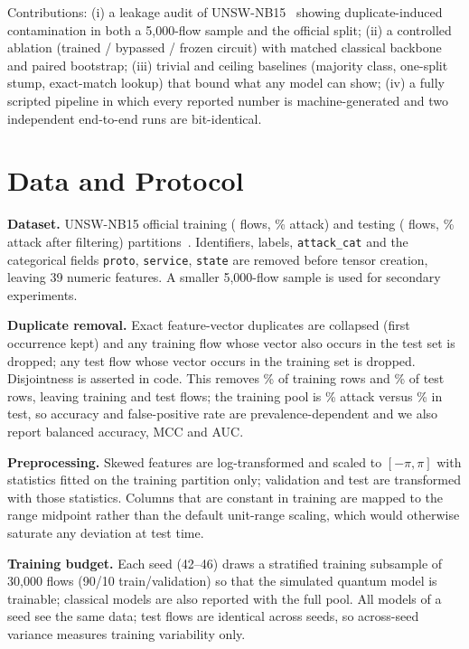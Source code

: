 \IfFileExists{IEEEtran.cls}{\documentclass[conference]{IEEEtran}}{\documentclass[10pt,twocolumn]{article}\usepackage[margin=0.8in]{geometry}}
\begin{document}
Contributions: (i) a leakage audit of UNSW-NB15~\cite{moustafa2015unsw} showing duplicate-induced contamination in both a 5{,}000-flow sample and the official split; (ii) a controlled ablation (trained / bypassed / frozen circuit) with matched classical backbone and paired bootstrap; (iii) trivial and ceiling baselines (majority class, one-split stump, exact-match lookup) that bound what any model can show; (iv) a fully scripted pipeline in which every reported number is machine-generated and two independent end-to-end runs are bit-identical.

\section{Data and Protocol}
\textbf{Dataset.} UNSW-NB15 official training (\offTrainRows{} flows, \offTrainAttackPct\% attack) and testing (\offTestRows{} flows, \offTestAttackPct\% attack after filtering) partitions~\cite{moustafa2015unsw}. Identifiers, labels, \texttt{attack\_cat} and the categorical fields \texttt{proto}, \texttt{service}, \texttt{state} are removed before tensor creation, leaving 39 numeric features. A smaller 5{,}000-flow sample is used for secondary experiments.

\textbf{Duplicate removal.} Exact feature-vector duplicates are collapsed (first occurrence kept) and any training flow whose vector also occurs in the test set is dropped; any test flow whose vector occurs in the training set is dropped. Disjointness is asserted in code. This removes \offTrainDupPct\% of training rows and \offTestTwinPct\% of test rows, leaving \offTrainPool{} training and \offTestFinal{} test flows; the training pool is \offPoolAttackPct\% attack versus \offTestAttackPct\% in test, so accuracy and false-positive rate are prevalence-dependent and we also report balanced accuracy, MCC and AUC.

\textbf{Preprocessing.} Skewed features are log-transformed and scaled to $[-\pi,\pi]$ with statistics fitted on the training partition only; validation and test are transformed with those statistics. Columns that are constant in training are mapped to the range midpoint rather than the default unit-range scaling, which would otherwise saturate any deviation at test time.

\textbf{Training budget.} Each seed (42--46) draws a stratified training subsample of 30{,}000 flows (90/10 train/validation) so that the simulated quantum model is trainable; classical models are also reported with the full pool. All models of a seed see the same data; test flows are identical across seeds, so across-seed variance measures training variability only.
\end{document}
